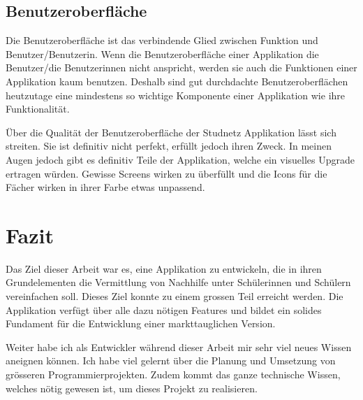 \documentclass[../main.tex]{subfiles}
\begin{document}
	\subsection*{Benutzeroberfläche}
	Die Benutzeroberfläche ist das verbindende Glied zwischen Funktion und Benutzer/Benutzerin. Wenn die Benutzeroberfläche einer Applikation die Benutzer/die Benutzerinnen nicht anspricht, werden sie auch die Funktionen einer Applikation kaum benutzen. Deshalb sind gut durchdachte Benutzeroberflächen heutzutage eine mindestens so wichtige Komponente einer Applikation wie ihre Funktionalität.
	
	Über die Qualität der Benutzeroberfläche der Studnetz Applikation lässt sich streiten. Sie ist definitiv nicht perfekt, erfüllt jedoch ihren Zweck. In meinen Augen jedoch gibt es definitiv Teile der Applikation, welche ein visuelles Upgrade ertragen würden. Gewisse Screens wirken zu überfüllt und die Icons für die Fächer wirken in ihrer Farbe etwas unpassend.
	
	\section{Fazit}
	Das Ziel dieser Arbeit war es, eine Applikation zu entwickeln, die in ihren Grundelementen die Vermittlung von Nachhilfe unter Schülerinnen und Schülern vereinfachen soll. Dieses Ziel konnte zu einem grossen Teil erreicht werden. Die Applikation verfügt über alle dazu nötigen Features und bildet ein solides Fundament für die Entwicklung einer markttauglichen Version.
	
	Weiter habe ich als Entwickler während dieser Arbeit mir sehr viel neues Wissen aneignen können. Ich habe viel gelernt über die Planung und Umsetzung von grösseren Programmierprojekten. Zudem kommt das ganze technische  Wissen, welches nötig gewesen ist, um dieses Projekt zu realisieren.
\end{document}

